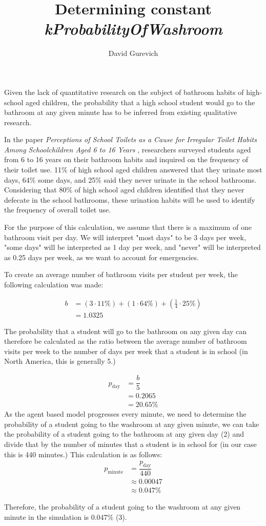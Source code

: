 \documentclass[preview, border=12pt, varwidth]{article}
\title{Determining constant \textit{kProbabilityOfWashroom}}
\author{David Gurevich}
\date{}
\begin{document}
\maketitle

Given the lack of quantitative research on the subject of bathroom habits of high-school aged children, the probability that a high school student would go to the bathroom at any given minute has to be inferred from existing qualitative research.

In the paper \textit{Perceptions of School Toilets as a Cause for Irregular Toilet Habits Among Schoolchildren Aged 6 to 16 Years} \cite{lundblad2005perceptions}, researchers surveyed students aged from 6 to 16 years on their bathroom habits and inquired on the frequency of their toilet use. 11\% of high school aged children answered that they urinate most days, 64\% some days, and 25\% said they never urinate in the school bathrooms. Considering that 80\% of high school aged children identified that they never defecate in the school bathrooms, these urination habits will be used to identify the frequency of overall toilet use.

For the purpose of this calculation, we assume that there is a maximum of one bathroom visit per day. We will interpret "most days" to be 3 days per week, "some days" will be interpreted as 1 day per week, and "never" will be interpreted as 0.25 days per week, as we want to account for emergencies.

To create an average number of bathroom visits per student per week, the following calculation was made:


\begin{align}
b &= (3 \cdot 11\%) + (1 \cdot 64\%) + (\frac{1}{4} \cdot 25\%) \nonumber \\
  &= 1.0325
\end{align}

The probability that a student will go to the bathroom on any given day can therefore be calculated as the ratio between the average number of bathroom visits per week to the number of days per week that a student is in school (in North America, this is generally 5.)

\begin{align}
p_{\text{day}} &= \dfrac{b}{5} \nonumber \\
&= 0.2065 \nonumber \\
&= 20.65 \%
\end{align}
\newpage
As the agent based model progresses every minute, we need to determine the probability of a student going to the washroom at any given minute, we can take the probability of a student going to the bathroom at any given day (2) and divide that by the number of minutes that a student is in school for (in our case this is 440 minutes.) This calculation is as follows:
\begin{align}
p_{\text{minute}} &= \dfrac{p_{\text{day}}}{440} \nonumber \\
&\approx 0.00047 \nonumber \\
&\approx 0.047\%
\end{align}

Therefore, the probability of a student going to the washroom at any given minute in the simulation is 0.047\% (3).


\end{document}
